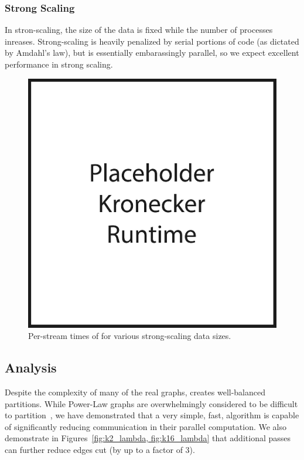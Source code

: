 {\subsubsection{Strong Scaling}
In stron-scaling, the size of the data is fixed while the number of processes inreases. Strong-scaling is heavily penalized by serial portions of code (as dictated by Amdahl's law), but \ourmethod is essentially embarassingly parallel, so we expect excellent performance in strong scaling. 

\begin{figure}[h!]
\centering
  \includegraphics[width=0.8\columnwidth]{figures/kronecker_speed_tests.pdf}
  \caption{Per-stream times of \ourmethod for various strong-scaling data sizes.}
  \label{fig:kronspeed}
\end{figure}


\subsection{Analysis}
Despite the complexity of many of the real graphs, \ourmethod creates well-balanced partitions.
While Power-Law graphs are overwhelmingly considered to be difficult to partition~\cite{Abou-Rjeili:2006:MAP:1898953.1899055}, we have demonstrated that a very simple, fast, algorithm is capable of significantly reducing communication in their parallel computation. 
We also demonstrate in Figures~\ref{fig:k2_lambda, fig:k16_lambda} that additional passes can further reduce edges cut (by up to a factor of 3). 

}
